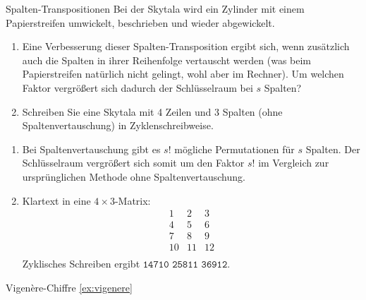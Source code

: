 \documentclass{article}
\begin{document}
\begin{exercise}{Spalten-Transpositionen}
  Bei der Skytala wird ein Zylinder mit einem Papierstreifen umwickelt, beschrieben und wieder abgewickelt.
  \begin{enumerate}
      \item Eine Verbesserung dieser Spalten-Transposition ergibt sich, wenn zusätzlich auch die Spalten in ihrer Reihenfolge vertauscht werden (was beim Papierstreifen natürlich nicht gelingt, wohl aber im Rechner). Um welchen Faktor vergrößert sich dadurch der Schlüsselraum bei $s$ Spalten?
      \item Schreiben Sie eine Skytala mit 4 Zeilen und 3 Spalten (ohne Spaltenvertauschung) in Zyklenschreibweise.
  \end{enumerate}

  \begin{solution}
    \begin{enumerate}
        \item Bei Spaltenvertauschung gibt es $s!$ mögliche Permutationen für $s$ Spalten. Der Schlüsselraum vergrößert sich somit um den Faktor $s!$ im Vergleich zur ursprünglichen Methode ohne Spaltenvertauschung.
        \item Klartext in eine $4\times3$-Matrix:
          \[
            \begin{array}{ccc}
            1 & 2 & 3 \\
            4 & 5 & 6 \\
            7 & 8 & 9 \\
            10 & 11 & 12 \\
            \end{array}
          \]
          Zyklisches Schreiben ergibt $\texttt{14710 25811 36912}$.
    \end{enumerate}
  \end{solution}
\end{exercise}

\setcounter{subsection}{20}
\begin{exercise}{Vigenère-Chiffre \ref{ex:vigenere}}\end{exercise}
\end{document}
